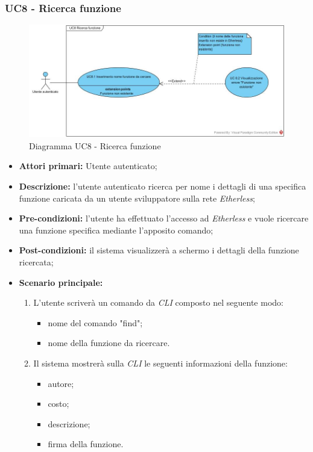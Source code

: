 \subsubsection{UC8 - Ricerca funzione}
\begin{figure}[h]
	\centering
	\includegraphics[width=\linewidth]{res/img/UC8.jpg}
	\caption{Diagramma UC8 - Ricerca funzione}
\end{figure}
\begin{itemize}
	\item \textbf{Attori primari:} Utente autenticato;
	\item \textbf{Descrizione:} l'utente autenticato ricerca per nome i dettagli di una specifica funzione caricata da un utente sviluppatore sulla rete \textit{Etherless}; 
	\item \textbf{Pre-condizioni:} l'utente ha effettuato l'accesso ad \textit{Etherless} e vuole ricercare una funzione specifica mediante l'apposito comando;
	\item \textbf{Post-condizioni:} il sistema visualizzerà a schermo i dettagli della funzione ricercata;
	\item \textbf{Scenario principale:} 
	\begin{enumerate}
		\item L'utente scriverà un comando da \textit{CLI\glos} composto nel seguente modo:
		\begin{itemize}
			\item nome del comando "find";
			\item nome della funzione da ricercare.
		\end{itemize} 
		\item Il sistema mostrerà sulla \textit{CLI\glo} le seguenti informazioni della funzione:
		\begin{itemize}
			\item autore;
			\item costo;
			\item descrizione;
			\item firma della funzione.
		\end{itemize}  
	\end{enumerate}	
\end{itemize}